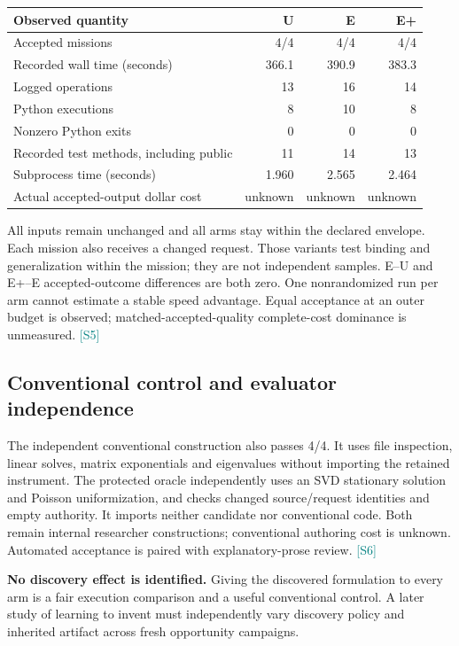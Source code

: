 \documentclass[10pt,letterpaper]{article}
\newcommand{\src}[1]{\textcolor{Teal}{\scriptsize[#1]}}
\newcommand{\SUWall}{366.1}
\newcommand{\SUOps}{13}
\newcommand{\SURuns}{8}
\newcommand{\SUTests}{11}
\newcommand{\SUTool}{1.960}
\newcommand{\SEWall}{390.9}
\newcommand{\SEOps}{16}
\newcommand{\SERuns}{10}
\newcommand{\SETests}{14}
\newcommand{\SETool}{2.565}
\newcommand{\SPlusWall}{383.3}
\newcommand{\SPlusOps}{14}
\newcommand{\SPlusRuns}{8}
\newcommand{\SPlusTests}{13}
\newcommand{\SPlusTool}{2.464}
\begin{document}
\begin{center}
\begin{tabular}{@{}lrrr@{}}
\toprule
\textbf{Observed quantity} & \textbf{U} & \textbf{E} & \textbf{E+} \\
\midrule
Accepted missions & 4/4 & 4/4 & 4/4 \\
Recorded wall time (seconds) & \SUWall & \SEWall & \SPlusWall \\
Logged operations & \SUOps & \SEOps & \SPlusOps \\
Python executions & \SURuns & \SERuns & \SPlusRuns \\
Nonzero Python exits & 0 & 0 & 0 \\
Recorded test methods, including public & \SUTests & \SETests & \SPlusTests \\
Subprocess time (seconds) & \SUTool & \SETool & \SPlusTool \\
Actual accepted-output dollar cost & unknown & unknown & unknown \\
\bottomrule
\end{tabular}
\end{center}

All inputs remain unchanged and all arms stay within the declared envelope. Each mission also receives a changed request. Those variants test binding and generalization within the mission; they are not independent samples. E--U and E+--E accepted-outcome differences are both zero. One nonrandomized run per arm cannot estimate a stable speed advantage. Equal acceptance at an outer budget is observed; matched-accepted-quality complete-cost dominance is unmeasured. \src{S5}

\subsection*{Conventional control and evaluator independence}
The independent conventional construction also passes 4/4. It uses file inspection, linear solves, matrix exponentials and eigenvalues without importing the retained instrument. The protected oracle independently uses an SVD stationary solution and Poisson uniformization, and checks changed source/request identities and empty authority. It imports neither candidate nor conventional code. Both remain internal researcher constructions; conventional authoring cost is unknown. Automated acceptance is paired with explanatory-prose review. \src{S6}

\textbf{No discovery effect is identified.} Giving the discovered formulation to every arm is a fair execution comparison and a useful conventional control. A later study of learning to invent must independently vary discovery policy and inherited artifact across fresh opportunity campaigns.
\end{document}
